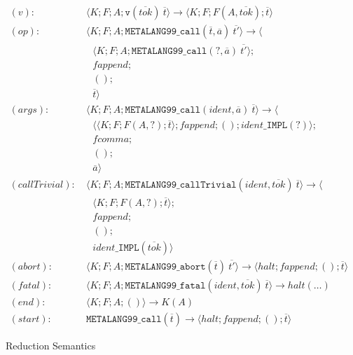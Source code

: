 \documentclass[12pt]{article}
\theoremstyle{break}
\begin{document}
\begin{figure}
    \caption{Reduction Semantics}

    \begin{align*}
        (v): & \ \langle K; F; A; \texttt{v}(\overline{tok}) \ \overline{t} \rangle \to
            \langle K; F; F(A, \overline{tok}); \overline{t} \rangle \\
        (op): & \ \langle K; F; A; \texttt{METALANG99\_call}(\overline{t}, \overline{a}) \ \overline{t'} \rangle \to \langle \\
            & \ \ \ \ \langle K; F; A; \texttt{METALANG99\_call}(?, \overline{a}) \ \overline{t'} \rangle; \\
            & \ \ \ \ fappend; \\
            & \ \ \ \ (); \\
            & \ \ \ \ \overline{t} \rangle \\
        (args): & \ \langle K; F; A; \texttt{METALANG99\_call}(ident, \overline{a}) \ \overline{t} \rangle \to \langle \\
            & \ \ \ \ \langle \langle K; F; F(A, ?); \overline{t} \rangle; fappend; (); ident\texttt{\_IMPL}(?) \rangle; \\
            & \ \ \ \ fcomma; \\
            & \ \ \ \ (); \\
            & \ \ \ \ \overline{a} \rangle \\
        (callTrivial): & \ \langle K; F; A; \texttt{METALANG99\_callTrivial}(ident, \overline{tok}) \ \overline{t} \rangle \to \langle \\
            & \ \ \ \ \langle K; F; F(A, ?); \overline{t} \rangle; \\
            & \ \ \ \ fappend; \\
            & \ \ \ \ (); \\
            & \ \ \ \ ident\texttt{\_IMPL}(\overline{tok}) \rangle \\
        (abort): & \ \langle K; F; A; \texttt{METALANG99\_abort}(\overline{t}) \ \overline{t'} \rangle \to \langle halt; fappend; (); \overline{t} \rangle \\
        (fatal): & \ \langle K; F; A; \texttt{METALANG99\_fatal}(ident, \overline{tok}) \ \overline{t} \rangle \to halt(\ldots) \\
        (end): & \ \langle K; F; A; () \rangle \to K(A) \\
        (start): & \ \texttt{METALANG99\_call}(\overline{t}) \to \langle halt; fappend; (); \overline{t} \rangle
    \end{align*}
    \label{ReductionSemantics}
\end{figure}
\end{document}
